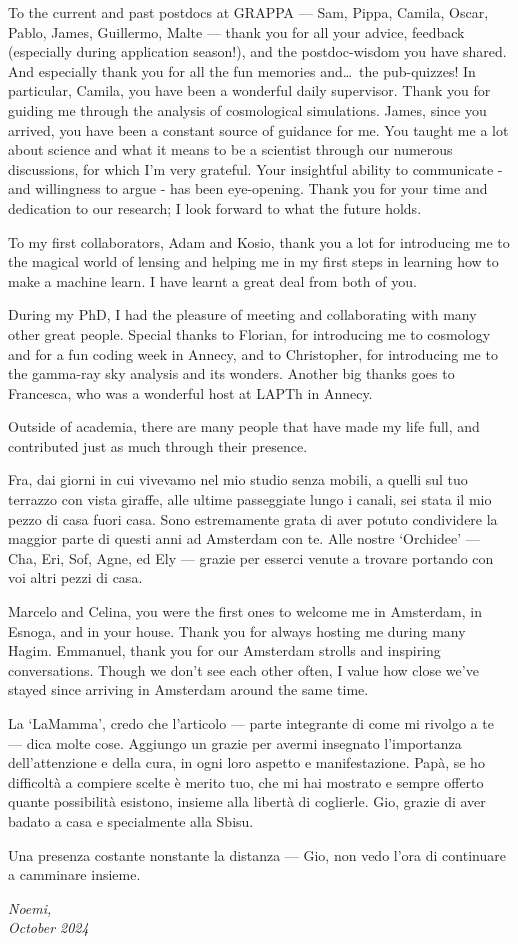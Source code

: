 \clearpage
To the current and past postdocs at GRAPPA --- Sam, Pippa, Camila, Oscar, Pablo, James, Guillermo, Malte --- thank you for all your advice, feedback (especially during application season!), and the postdoc-wisdom you have shared. And especially thank you for all the fun memories and\dots\ the pub-quizzes! In particular, Camila, you have been a wonderful daily supervisor. Thank you for guiding me through the analysis of cosmological simulations.
James, since you arrived, you have been a constant source of guidance for me. You taught me a lot about science and what it means to be a scientist through our numerous discussions, for which I’m very grateful. Your insightful ability to communicate - and willingness to argue - has been eye-opening. Thank you for your time and dedication to our research; I look forward to what the future holds.

To my first collaborators, Adam and Kosio, thank you a lot for introducing me to the magical world of lensing and helping me in my first steps in learning how to make a machine learn. I have learnt a great deal from both of you.

During my PhD, I had the pleasure of meeting and collaborating with many other great people. Special thanks to Florian, for introducing me to cosmology and for a fun coding week in Annecy, and to Christopher, for introducing me to the gamma-ray sky analysis and its wonders. Another big thanks goes to Francesca, who was a wonderful host at LAPTh in Annecy.

Outside of academia, there are many people that have made my life full, and contributed just as much through their presence.

Fra, dai giorni in cui vivevamo nel mio studio senza mobili, a quelli sul tuo terrazzo con vista giraffe, alle ultime passeggiate lungo i canali, sei stata il mio pezzo di casa fuori casa. Sono estremamente grata di aver potuto condividere la maggior parte di questi anni ad Amsterdam con te. 
Alle nostre `Orchidee' --- Cha, Eri, Sof, Agne, ed Ely --- grazie per esserci venute a trovare portando con voi altri pezzi di casa. 

Marcelo and Celina, you were the first ones to welcome me in Amsterdam, in Esnoga, and in your house. Thank you for always hosting me during many Hagim. 
Emmanuel, thank you for our Amsterdam strolls and inspiring conversations. Though we don’t see each other often, I value how close we’ve stayed since arriving in Amsterdam around the same time.

La `LaMamma', credo che l'articolo --- parte integrante di come mi rivolgo a te --- dica molte cose. Aggiungo un grazie per avermi insegnato l'importanza dell'attenzione e della cura, in ogni loro aspetto e manifestazione. Papà, se ho difficoltà a compiere scelte è merito tuo, che mi hai mostrato e sempre offerto quante possibilità esistono, insieme alla libertà di coglierle. Gio, grazie di aver badato a casa e specialmente alla Sbisu. 

\clearpage
Una presenza costante nonstante la distanza --- Gio, non vedo l'ora di continuare a camminare insieme. 

\vskip 2pt

\begin{flushright}
\textit{Noemi, \\
October 2024}
\end{flushright}

